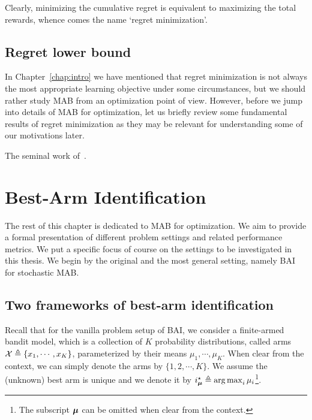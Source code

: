 Clearly, minimizing the cumulative regret is equivalent to maximizing the total rewards, whence comes the name `regret minimization'. 

\subsection{Regret lower bound}

In Chapter~\ref{chap:intro} we have mentioned that regret minimization is not always the most appropriate learning objective under some circumstances, but we should rather study MAB from an optimization point of view. However, before we jump into details of MAB for optimization, let us briefly review some fundamental results of regret minimization as they may be relevant for understanding some of our motivations later.

The seminal work of~\cite{robbins1952}.

\section{Best-Arm Identification}\label{sec:mab.bai}

The rest of this chapter is dedicated to MAB for optimization. We aim to provide a formal presentation of different problem settings and related performance metrics. We put a specific focus of course on the settings to be investigated in this thesis. We begin by the original and the most general setting, namely BAI for stochastic MAB.

\subsection{Two frameworks of best-arm identification}\label{sec:mab.bai.frameworks}

Recall that for the vanilla problem setup of BAI, we consider a finite-armed bandit model, which is a collection of $K$ probability distributions, called arms $\mathcal{X}\triangleq\{x_1,\cdots,x_K\}$, parameterized by their means $\mu_1, \cdots, \mu_K$. When clear from the context, we can simply denote the arms by $\{1,2,\cdots,K\}$. We assume the (unknown) best arm is unique and we denote it by $i_{{\boldsymbol \mu}}^\star \triangleq \operatorname*{arg\,max}_i \mu_i$\footnote{The subscript ${\boldsymbol \mu}$ can be omitted when clear from the context.}. 


